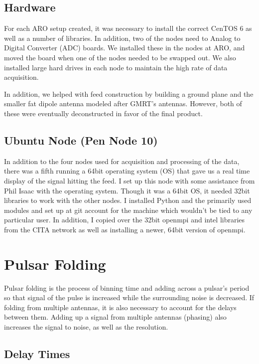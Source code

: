 \documentclass[a4paper,12pt]{article}
\begin{document}
\subsection{Hardware}
\label{sec:hardware}

For each ARO setup created, it was necessary to install the correct CenTOS 6 as well as a number of libraries. In addition, two of the nodes need to Analog to Digital Converter (ADC) boards. We installed these in the nodes at ARO, and moved the board when one of the nodes needed to be swapped out. We also installed large hard drives in each node to maintain the high rate of data acquisition.

In addition, we helped with feed construction by building a ground plane and the smaller fat dipole antenna modeled after GMRT’s antennas. However, both of these were eventually deconstructed in favor of the final product.

\subsection{Ubuntu Node (Pen Node 10)}
\label{sec:ubuntunode}

In addition to the four nodes used for acquisition and processing of the data, there was a fifth running a 64bit operating system (OS) that gave us a real time display of the signal hitting the feed. I set up this node with some assistance from Phil Isaac with the operating system. Though it was a 64bit OS, it needed 32bit libraries to work with the other nodes.  I installed Python and the primarily used modules and set up at git account for the machine which wouldn’t be tied to any particular user. In addition, I copied over the 32bit openmpi and intel libraries from the CITA network as well as installing a newer, 64bit version of openmpi.

\section{Pulsar Folding}
\label{sec:pulsarfolding}

Pulsar folding is the process of binning time and adding across a pulsar’s period so that signal of the pulse is increased while the surrounding noise is decreased. If folding from multiple antennas, it is also necessary to account for the delays between them. Adding up a signal from multiple antennas (phasing) also increases the signal to noise, as well as the resolution.

\subsection{Delay Times}
\label{sec:delaytimes}
\end{document}

